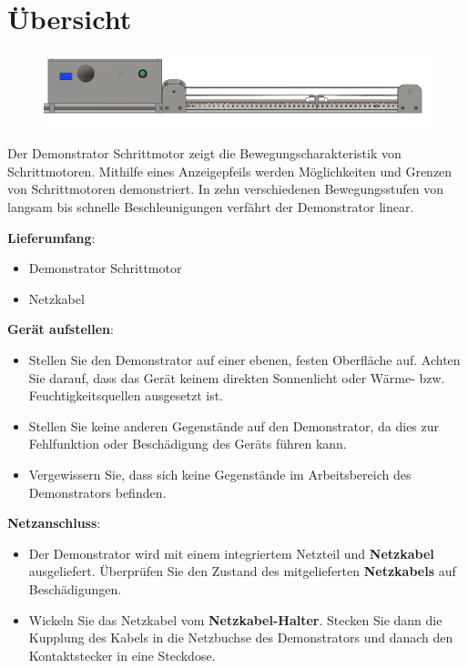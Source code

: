 %
%



\chapter{Übersicht}

\begin{figure}[htb]
	\begin{center}
		
			\includegraphics[width=\textwidth]{Images/Konstruktion1.png}
	\end{center}
\end{figure}

Der Demonstrator Schrittmotor zeigt die Bewegungscharakteristik von Schrittmotoren. Mithilfe eines Anzeigepfeils werden Möglichkeiten und Grenzen von Schrittmotoren demonstriert. In zehn verschiedenen Bewegungsstufen von langsam bis schnelle Beschleunigungen verfährt der Demonstrator linear. 

\newpage
\textbf{Lieferumfang}: 
\begin{itemize}
\item Demonstrator Schrittmotor	
\item Netzkabel
	\end{itemize} 	
	\bigskip
	\textbf{Gerät aufstellen}: 
	\begin{itemize}
	\item Stellen Sie den Demonstrator auf einer ebenen, festen Oberfläche auf. Achten Sie darauf, dass das Gerät keinem direkten Sonnenlicht oder Wärme- bzw. Feuchtigkeitsquellen ausgesetzt ist. 
	\item Stellen Sie keine anderen Gegenstände auf den Demonstrator, da dies zur Fehlfunktion oder Beschädigung des Geräts führen kann. 
	\item Vergewissern Sie, dass sich keine Gegenstände im Arbeitsbereich des Demonstrators befinden.
	\end{itemize}
	\textbf{Netzanschluss}:
	\begin{itemize}
		\item Der Demonstrator wird mit einem integriertem Netzteil und \textbf{Netzkabel} ausgeliefert. Überprüfen Sie den Zustand des mitgelieferten \textbf{Netzkabels} auf Beschädigungen.
		\item Wickeln Sie das Netzkabel vom \textbf{Netzkabel-Halter}. Stecken Sie dann die Kupplung des Kabels in die Netzbuchse des Demonstrators und danach den Kontaktstecker in eine Steckdose. 
	\end{itemize} 



